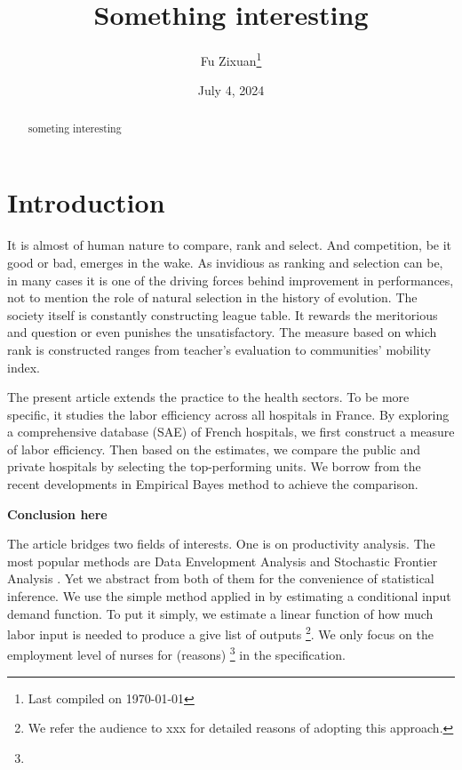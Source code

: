 \documentclass[12pt]{article}
\title{Something interesting}
\author{Fu Zixuan\thanks{Last compiled on \today}}
\date{July 4, 2024}
\begin{document}
\maketitle

\begin{abstract}
    \noindent  someting interesting\\


    \bigskip
\end{abstract}

\newpage
\tableofcontents
\newpage

\section{Introduction}

It is almost of human nature to compare, rank and select. And competition, be
it good or bad, emerges in the wake. As invidious as ranking and selection can
be, in many cases it is one of the driving forces behind improvement in
performances, not to mention the role of natural selection in the history of
evolution. The society itself is constantly constructing league table. It
rewards the meritorious and question or even punishes the unsatisfactory. The
measure based on which rank is constructed ranges from teacher's evaluation to
communities' mobility index.

The present article extends the practice to the health sectors. To be more
specific, it studies the labor efficiency across all hospitals in France. By
exploring a comprehensive database (SAE) of French hospitals, we first
construct a measure of labor efficiency. Then based on the estimates, we
compare the public and private hospitals by selecting the top-performing units.
We borrow from the recent developments in Empirical Bayes method to achieve the
comparison.

\textbf{Conclusion here}

The article bridges two fields of interests. One is on productivity analysis.
The most popular methods are Data Envelopment Analysis
\cite{charnes1978measuring} and Stochastic Frontier Analysis
\cite{aigner1977formulation,meeusen1977efficiency}. Yet we abstract from both
of them for the convenience of statistical inference. We use the simple method
applied in \cite{croiset2024hospitals} by estimating a conditional input demand
function. To put it simply, we estimate a linear function of how much labor
input is needed to produce a give list of outputs \footnote{We refer the
    audience to xxx for detailed reasons of adopting this approach.}. We only focus
on the employment level of nurses for (reasons) \footnote{} in the
specification.
\end{document}
